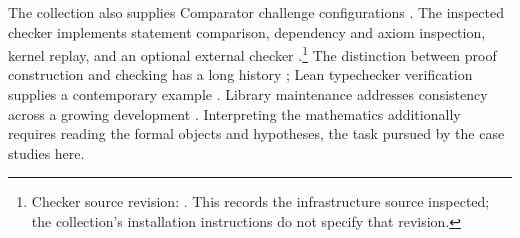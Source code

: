 The collection also supplies Comparator challenge configurations
\citep{OAIComparator}. The inspected checker implements statement
comparison, dependency and axiom inspection, kernel replay, and an
optional external checker \citep{ComparatorSource2026}.\footnote{Checker
source revision: . This
records the infrastructure source inspected; the collection's
installation instructions do not specify that revision.}
The distinction between proof construction and checking has a long
history \citep{deBruijn1970,BarendregtWiedijk2005}; Lean typechecker
verification supplies a contemporary example \citep{Carneiro2025Lean4Lean}.
Library maintenance addresses consistency across a growing development
\citep{vanDoornEbnerLewis2020}. Interpreting the mathematics additionally
requires reading the formal objects and hypotheses, the task pursued
by the case studies here.
